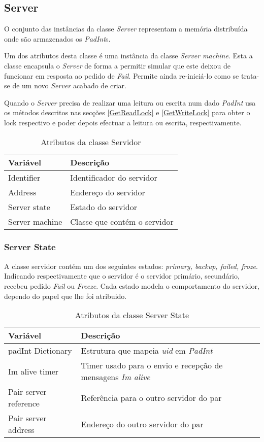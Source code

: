 \subsection{Server}
O conjunto das instâncias da classe \textit{Server} representam a memória distribuída onde são armazenados os \textit{PadInt}s.

Um dos atributos desta classe é uma instância da classe \textit{Server machine}. Esta a classe encapsula o \textit{Server} de forma a permitir simular que este deixou de funcionar em resposta ao pedido de \textit{Fail}. Permite ainda re-iniciá-lo como se trata-se de um novo \textit{Server} acabado de criar.

Quando o \textit{Server} precisa de realizar uma leitura ou escrita num dado \textit{PadInt} usa os métodos descritos nas secções \ref{GetReadLock} e \ref{GetWriteLock} para obter o lock respectivo e poder depois efectuar a leitura ou escrita, respectivamente.

\begin{table}[H]
\centering
\begin{tabular}{| p{2cm} | p{} |}
\hline
\textbf{Variável} & \textbf{Descrição} \\
\hline
Identifier & Identificador do servidor \\
\hline
Address & Endereço do servidor \\
\hline
Server state & Estado do servidor\\
\hline
Server machine & Classe que contém o servidor\\
\hline
\end{tabular}
\caption{Atributos da classe Servidor}
\end{table}

\subsubsection{Server State}
A classe servidor contém um dos seguintes estados: \textit{primary, backup, failed, froze}. Indicando respectivamente que o servidor é o servidor primário, secundário, recebeu pedido  \textit{Fail} ou \textit{Freeze}. Cada estado modela o comportamento do servidor, dependo do papel que lhe foi atribuido.

\begin{table}[H]
\centering
\begin{tabular}{| p{2cm} | p{} |}
\hline
\textbf{Variável} & \textbf{Descrição} \\
\hline
padInt Dictionary & Estrutura que mapeia \textit{uid} em \textit{PadInt} \\
\hline
Im alive timer & Timer usado para o envio e recepção de mensagens \textit{Im alive}\\
\hline
Pair server reference & Referência para o outro servidor do par\\
\hline
Pair server address & Endereço do outro servidor do par\\
\hline
\end{tabular}
\caption{Atributos da classe Server State}
\end{table}